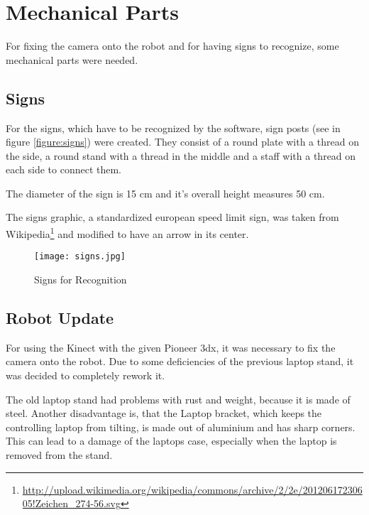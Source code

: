 \chapter{Mechanical Parts}
\graphicspath{{./Mechanical/img/}}

For fixing the camera onto the robot and for having signs to recognize,
some mechanical parts were needed.

\section{Signs}

For the signs, which have to be recognized by the software, sign posts (see in figure \vref{figure:signs}) were created.
They consist of a round plate with a thread on the side, a round stand with a thread in the middle and a staff
with a thread on each side to connect them.

The diameter of the sign is 15 cm and it's overall height measures 50 cm.

The signs graphic, a standardized european speed limit sign, was taken from\\ 
Wikipedia\footnote{\url{http://upload.wikimedia.org/wikipedia/commons/archive/2/2e/20120617230605!Zeichen_274-56.svg}}
and modified to have an arrow in its center. 

 \begin{figure}[htp]
\begin{center}
  \texttt{[image: signs.jpg]}
  \caption{Signs for Recognition}
  \label{figure:signs}
\end{center}
\end{figure}

\section{Robot Update}

For using the Kinect with the given Pioneer 3dx, it was necessary to fix the camera onto the robot.
Due to some deficiencies of the previous laptop stand, it was decided to completely rework it.

The old laptop stand had problems with rust and weight,
because it is made of steel. Another disadvantage is, that the Laptop bracket, which keeps the 
controlling laptop from tilting, is made out of aluminium and has sharp corners. This can lead
to a damage of the laptops case, especially when the laptop is removed from the stand. 

